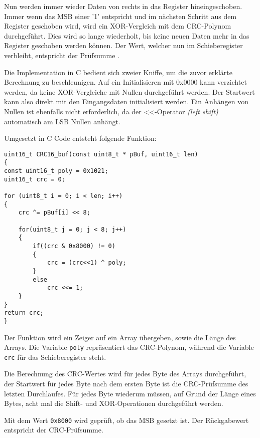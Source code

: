 \smallskip

Nun werden immer wieder Daten von rechts in das Register hineingeschoben. Immer wenn das \ac{MSB} einer '1' entspricht und im nächsten Schritt aus dem Register
geschoben wird, wird ein XOR-Vergleich mit dem CRC-Polynom durchgeführt. Dies wird so lange wiederholt, bis keine neuen Daten mehr in das Register geschoben werden können.
Der Wert, welcher nun im Schieberegister verbleibt, entspricht der Prüfsumme \citep{IK_VL}.

\smallskip

Die Implementation in C bedient sich zweier Kniffe, um die zuvor erklärte Berechnung zu beschleunigen. Auf ein Initialisieren mit 0x0000 kann verzichtet werden,
da keine XOR-Vergleiche mit Nullen durchgeführt werden. Der Startwert kann also direkt mit den Eingangsdaten initialisiert werden. Ein Anhängen von Nullen ist ebenfalls
nicht erforderlich, da der <<-Operator \textit{(left shift)} automatisch am \ac{LSB} Nullen anhängt. 

\newpage

Umgesetzt in C Code entsteht folgende Funktion: 

\begin{lstlisting}[caption={\textit{Berechnung CRC16}}]
uint16_t CRC16_buf(const uint8_t * pBuf, uint16_t len) 
{
const uint16_t poly = 0x1021;
uint16_t crc = 0;

for (uint8_t i = 0; i < len; i++)
{
    crc ^= pBuf[i] << 8; 

    for(uint8_t j = 0; j < 8; j++)
    {
        if((crc & 0x8000) != 0) 
        {
            crc = (crc<<1) ^ poly; 
        }
        else
            crc <<= 1;
    }
}
return crc;
}
\end{lstlisting}

Der Funktion wird ein Zeiger auf ein Array übergeben, sowie die Länge des Arrays. Die Variable \lstinline!poly! repräsentiert das CRC-Polynom,
während die Variable \lstinline!crc! für das Schieberegister steht.

\smallskip

Die Berechnung des CRC-Wertes wird für jedes Byte des Arrays durchgeführt, der Startwert für jedes Byte nach dem ersten Byte ist die CRC-Prüfsumme des 
letzten Durchlaufes. Für jedes Byte wiederum müssen, auf Grund der Länge eines Bytes, acht mal die Shift- und XOR-Operationen durchgeführt werden.

\smallskip

Mit dem Wert \lstinline!0x8000! wird geprüft, ob das \ac{MSB} gesetzt ist. Der Rückgabewert entspricht der CRC-Prüfsumme. 

